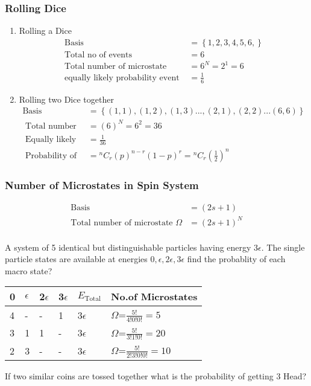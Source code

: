 \subsubsection{ Rolling Dice}
\begin{enumerate}
	\item Rolling a Dice
	\begin{align*}
	\text{Basis }&=\left\lbrace 1,2,3,4,5,6,\right\rbrace \\
	\text{Total no of events }&=6\\
	\text{Total number of microstate }&=6^N=2^1=6 \\
	\text{equally likely probability event }&=\frac{1}{6} 
	\end{align*}
	\item {Rolling two Dice together}
	\begin{align*}
	\text{Basis }&=\left\lbrace (1,1), (1,2),(1,3)..., (2,1),(2,2)...(6,6)\right\rbrace \\
	\text{ Total number of microstates }&=(6)^{N}=6^2=36\\
	\text{ Equally likely Probability }&=\frac{1}{36} \\
	\text { Probability of general event } 
	&={ }^{n} C_{r}(p)^{n-r}(1-p)^{r} =
	{ }^{n} C_{r}\left(\frac{1}{2}\right)^{n}
	\end{align*}
\end{enumerate}
\subsubsection{ Number of Microstates in Spin System}
\begin{align*}
\text{Basis }&=(2s+1) \\
\text{Total number of microstate }\Omega&=(2 s+1)^{N} \\
\end{align*}


\begin{exercise}\label{exercise1}
	A system of 5 identical but distinguishable particles having energy $3\epsilon$. The single particle states are available at energies $0,\epsilon,2\epsilon,3\epsilon$ find the probablity of each macro state?
\end{exercise}
\renewcommand*{\arraystretch}{2}
\begin{tabular}{|p{1cm}|p{1cm}|p{1cm}|p{1cm}|p{1cm}|p{3cm}|}
	\hline
	0&$\epsilon$&2$\epsilon$&3$\epsilon$&$E_{\text{Total}}$&No.of Microstates\\\hline
	4&-&-&1&3$\epsilon$&$\Omega$=$\frac{5!}{4!0!0!}=5$\\\hline
	3&1&1&-&3$\epsilon$&$\Omega$=$\frac{5!}{3!1!0!}=20$\\\hline
	2&3&-&-&3$\epsilon$&$\Omega$=$\frac{5!}{2!3!0!0!}=10$\\\hline
\end{tabular}
\begin{exercise}
	If two similar coins are tossed together what is the probability of getting 3 Head?
\end{exercise}

